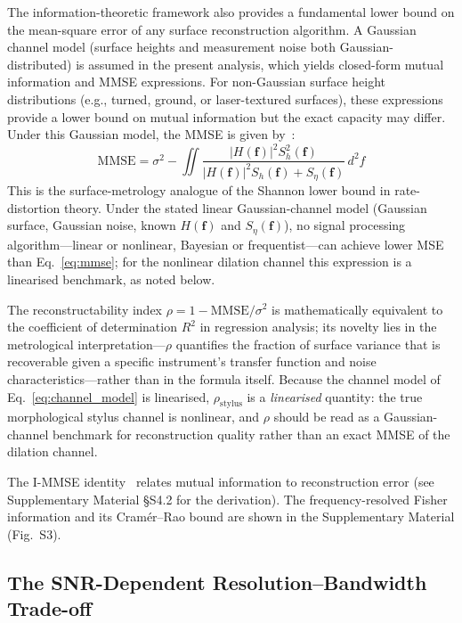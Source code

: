 \documentclass[review,12pt]{elsarticle}
\begin{document}
The information-theoretic framework also provides a fundamental lower bound on the mean-square error of any surface reconstruction algorithm. A Gaussian channel model (surface heights and measurement noise both Gaussian-distributed) is assumed in the present analysis, which yields closed-form mutual information and MMSE expressions. For non-Gaussian surface height distributions (e.g., turned, ground, or laser-textured surfaces), these expressions provide a lower bound on mutual information but the exact capacity may differ. Under this Gaussian model, the MMSE is given by~\cite{cover2006elements}:
\begin{equation}
    \mathrm{MMSE} = \sigma^2 - \iint \frac{|H(\mathbf{f})|^2 S_h^2(\mathbf{f})}{|H(\mathbf{f})|^2 S_h(\mathbf{f}) + S_\eta(\mathbf{f})} \, d^2\!f
    \label{eq:mmse}
\end{equation}
This is the surface-metrology analogue of the Shannon lower bound in rate-distortion theory. Under the stated linear Gaussian-channel model (Gaussian surface, Gaussian noise, known $H(\mathbf{f})$ and $S_\eta(\mathbf{f})$), no signal processing algorithm---linear or nonlinear, Bayesian or frequentist---can achieve lower MSE than Eq.~\ref{eq:mmse}; for the nonlinear dilation channel this expression is a linearised benchmark, as noted below.

The reconstructability index $\rho = 1 - \mathrm{MMSE}/\sigma^2$ is mathematically equivalent to the coefficient of determination $R^2$ in regression analysis; its novelty lies in the metrological interpretation---$\rho$ quantifies the fraction of surface variance that is recoverable given a specific instrument's transfer function and noise characteristics---rather than in the formula itself. Because the channel model of Eq.~\ref{eq:channel_model} is linearised, $\rho_\mathrm{stylus}$ is a \emph{linearised} quantity: the true morphological stylus channel is nonlinear, and $\rho$ should be read as a Gaussian-channel benchmark for reconstruction quality rather than an exact MMSE of the dilation channel.

The I-MMSE identity~\cite{guo2005mutual} relates mutual information to reconstruction error (see Supplementary Material \S S4.2 for the derivation). The frequency-resolved Fisher information and its Cram\'er--Rao bound are shown in the Supplementary Material (Fig.~S3).

\subsection{The SNR-Dependent Resolution--Bandwidth Trade-off}
\end{document}
